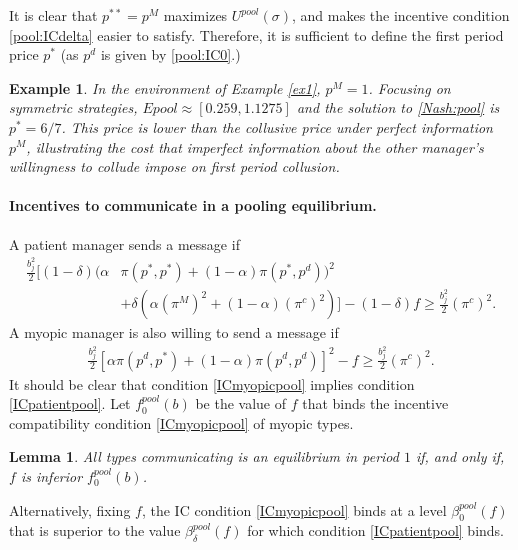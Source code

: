 \documentclass[]{article}
\newtheorem{lemma}{Lemma}
\newtheorem{example}{Example}
\begin{document}
%
It is clear that $p^{**}=p^M$ maximizes $U^{pool}(\sigma)$, and makes the incentive condition \eqref{pool:ICdelta} easier to satisfy. Therefore, it is sufficient to define the first period price $p^*$ (as $p^d$ is given by \eqref{pool:IC0}.)
%
\begin{example}
	In the environment of Example \ref{ex1}, $p^M=1$. Focusing on symmetric strategies, $Epool\approx[0.259,1.1275]$ and the solution to \eqref{Nash:pool} is $p^*=6/7$. This price is lower than the collusive price under perfect information $p^M$, illustrating the cost that imperfect information about the other manager's willingness to collude impose on first period collusion. 
\end{example}
%
\paragraph{Incentives to communicate in a pooling equilibrium.} 
A patient manager sends a message if 
\begin{equation}\label{ICpatientpool}
\begin{split}
	\frac{b^2_j}{2}\Big[(1-\delta) \big( \alpha &\pi(p^*,p^*) + (1-\alpha) \pi(p^*,p^d) \big)^2 \\
	&+ \delta (\alpha(\pi^M)^2  + (1-\alpha) (\pi^c)^2)\Big]-(1-\delta)f \geq \frac{b^2_j}{2} (\pi^c)^2 \text{.} 
\end{split}
\end{equation}
%
A myopic manager is also willing to send a message if
\begin{equation}\tag{ICmyopicpool}\label{ICmyopicpool}
 \begin{split}
 	\frac{b^2_j}{2} \left[\alpha \pi(p^d,p^*)+(1-\alpha)\pi(p^d,p^d)\right]^2 -f \geq \frac{b^2_j}{2} (\pi^c)^2 \text{.}
 \end{split}
\end{equation}
It should be clear that condition \eqref{ICmyopicpool} implies condition \eqref{ICpatientpool}. Let $f^{pool}_0(b)$ be the value of $f$ that binds the incentive compatibility condition \eqref{ICmyopicpool} of myopic types.
%
\begin{lemma}\label{lem:com_pooling}
All types communicating is an equilibrium in period $1$ if, and only if, $f$ is inferior $f^{pool}_0(b)$.
\end{lemma}
%
Alternatively, fixing $f$, the IC condition \eqref{ICmyopicpool} binds at a level $\beta^{pool}_0(f)$ that is superior to the value $\beta^{pool}_\delta(f)$ for which condition \eqref{ICpatientpool} binds. 
\end{document}
